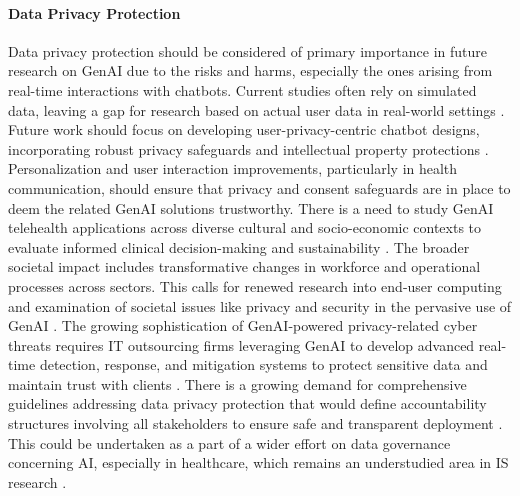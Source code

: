 \paragraph{Data Privacy Protection}
Data privacy protection should be considered of primary importance in future research on GenAI due to the risks and harms, especially the ones arising from real-time interactions with chatbots. Current studies often rely on simulated data, leaving a gap for research based on actual user data in real-world settings \parencite{S08}. Future work should focus on developing user-privacy-centric chatbot designs, incorporating robust privacy safeguards and intellectual property protections \parencite{S08,R08}.
Personalization and user interaction improvements, particularly in health communication, should ensure that privacy and consent safeguards are in place to deem the related GenAI solutions trustworthy. There is a need to study GenAI telehealth applications across diverse cultural and socio-economic contexts to evaluate informed clinical decision-making and sustainability \parencite{S11,S17}.
The broader societal impact includes transformative changes in workforce and operational processes across sectors. This calls for renewed research into end-user computing and examination of societal issues like privacy and security in the pervasive use of GenAI \parencite{R03,R10}.
The growing sophistication of GenAI-powered privacy-related cyber threats requires IT outsourcing firms leveraging GenAI to develop advanced real-time detection, response, and mitigation systems to protect sensitive data and maintain trust with clients \parencite{R03}.
There is a growing demand for comprehensive guidelines addressing data privacy protection that would define accountability structures involving all stakeholders to ensure safe and transparent deployment \parencite{S11,S12,S17}.
This could be undertaken as a part of a wider effort on data governance concerning AI, especially in healthcare, which remains an understudied area in IS research \parencite{R09}.


